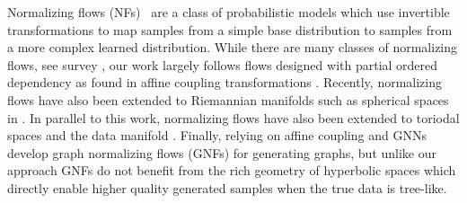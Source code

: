 Normalizing flows (NFs)~\cite{rezende2015variational,dinh2016density} are a class of probabilistic models which use invertible transformations to map samples from a simple base distribution to samples from a more complex learned distribution. While there are many classes of normalizing flows, see survey \cite{papamakarios2019normalizing,kobyzev2019normalizing}, our work largely follows flows designed with partial ordered dependency as found in affine coupling transformations \cite{dinh2016density}. 
Recently, normalizing flows have also been extended to Riemannian manifolds such as spherical spaces in \citet{gemici2016normalizing}. In parallel to this work, normalizing flows have also been extended to toriodal spaces \cite{rezende2020normalizing} and the data manifold \cite{brehmer2020flows}. Finally, relying on affine coupling and GNNs \cite{liu2019graph} develop graph normalizing flows (GNFs) for generating graphs, but unlike our approach GNFs do not benefit from the rich geometry of hyperbolic spaces which directly enable higher quality generated samples when the true data is tree-like.



